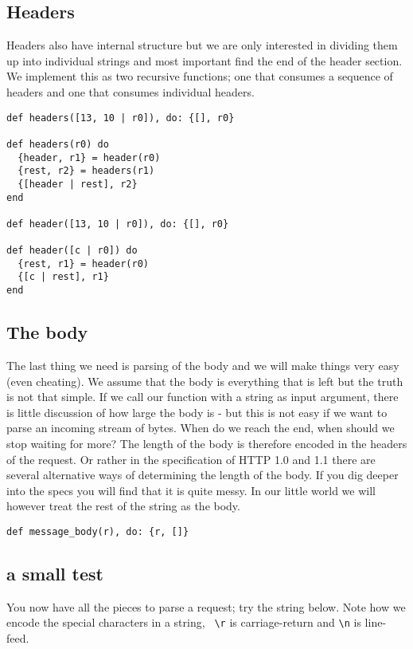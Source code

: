 \documentclass[a4paper,11pt]{article}
\begin{document}
\subsection{Headers}
Headers also have internal structure but we are only interested in
dividing them up into individual strings and most important find the
end of the header section. We implement this as two recursive functions;
one that consumes a sequence of headers and one that consumes
individual headers.

\begin{verbatim}
def headers([13, 10 | r0]), do: {[], r0}

def headers(r0) do
  {header, r1} = header(r0)
  {rest, r2} = headers(r1)
  {[header | rest], r2}
end

def header([13, 10 | r0]), do: {[], r0}

def header([c | r0]) do
  {rest, r1} = header(r0)
  {[c | rest], r1}
end
\end{verbatim}

\subsection{The body}
The last thing we need is parsing of the body and we will make things
very easy (even cheating). We assume that the body is everything that
is left but the truth is not that simple. If we call our function with
a string as input argument, there is little discussion of how large the
body is -  but this is not easy if we want to parse an incoming stream
of bytes. When do we reach the end, when should we stop waiting for
more? The length of the body is therefore encoded in the headers of
the request. Or rather in the specification of HTTP 1.0 and 1.1 there
are several alternative ways of determining the length of the
body. If you dig deeper into the specs you will find that it is quite
messy. In our little world we will however treat the rest of the string
as the body.

\begin{verbatim}
def message_body(r), do: {r, []}
\end{verbatim}

\subsection{a small test}

You now have all the pieces to parse a request; try the string
below. Note how we encode the special characters in a string, {\tt
  \textbackslash r} is carriage-return and {\tt \textbackslash n} is
line-feed.
\end{document}
